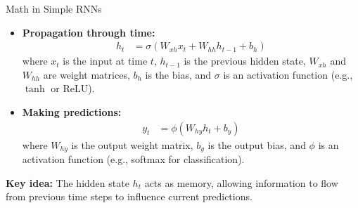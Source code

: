 \begin{frame}{Math in Simple RNNs}
    \begin{itemize}
        \item \textbf{Propagation through time:}
        \begin{align*}
            h_t &= \sigma(W_{xh} x_t + W_{hh} h_{t-1} + b_h)
        \end{align*}
        where $x_t$ is the input at time $t$, $h_{t-1}$ is the previous hidden state, $W_{xh}$ and $W_{hh}$ are weight matrices, $b_h$ is the bias, and $\sigma$ is an activation function (e.g., $\tanh$ or $\text{ReLU}$).
        \item \textbf{Making predictions:}
        \begin{align*}
            y_t &= \phi(W_{hy} h_t + b_y)
        \end{align*}
        where $W_{hy}$ is the output weight matrix, $b_y$ is the output bias, and $\phi$ is an activation function (e.g., softmax for classification).
    \end{itemize}
    \vspace{1em}
    \textbf{Key idea:} The hidden state $h_t$ acts as memory, allowing information to flow from previous time steps to influence current predictions.
\end{frame}

